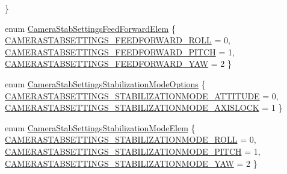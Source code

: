\begin{DoxyCompactItemize}
 \}
\item 
enum \hyperlink{group___camera_stab_settings_ga4bc67d38a639b8e80e953191e3742b9c}{\-Camera\-Stab\-Settings\-Feed\-Forward\-Elem} \{ \hyperlink{group___camera_stab_settings_gga4bc67d38a639b8e80e953191e3742b9ca3ed3cd5987ab68fa023c30aebaa58511}{\-C\-A\-M\-E\-R\-A\-S\-T\-A\-B\-S\-E\-T\-T\-I\-N\-G\-S\-\_\-\-F\-E\-E\-D\-F\-O\-R\-W\-A\-R\-D\-\_\-\-R\-O\-L\-L} = 0, 
\hyperlink{group___camera_stab_settings_gga4bc67d38a639b8e80e953191e3742b9ca5706d2470e4a9cd23a7189c431ca07aa}{\-C\-A\-M\-E\-R\-A\-S\-T\-A\-B\-S\-E\-T\-T\-I\-N\-G\-S\-\_\-\-F\-E\-E\-D\-F\-O\-R\-W\-A\-R\-D\-\_\-\-P\-I\-T\-C\-H} = 1, 
\hyperlink{group___camera_stab_settings_gga4bc67d38a639b8e80e953191e3742b9ca44cefcbe285047782fd884016dcf3cdc}{\-C\-A\-M\-E\-R\-A\-S\-T\-A\-B\-S\-E\-T\-T\-I\-N\-G\-S\-\_\-\-F\-E\-E\-D\-F\-O\-R\-W\-A\-R\-D\-\_\-\-Y\-A\-W} = 2
 \}
\item 
enum \hyperlink{group___camera_stab_settings_ga34fe3d7be18a3b4789da4fb07b5f3287}{\-Camera\-Stab\-Settings\-Stabilization\-Mode\-Options} \{ \hyperlink{group___camera_stab_settings_gga34fe3d7be18a3b4789da4fb07b5f3287ac9c35c367f0ce1790ecc2b5cf9878b5d}{\-C\-A\-M\-E\-R\-A\-S\-T\-A\-B\-S\-E\-T\-T\-I\-N\-G\-S\-\_\-\-S\-T\-A\-B\-I\-L\-I\-Z\-A\-T\-I\-O\-N\-M\-O\-D\-E\-\_\-\-A\-T\-T\-I\-T\-U\-D\-E} = 0, 
\hyperlink{group___camera_stab_settings_gga34fe3d7be18a3b4789da4fb07b5f3287a0b50897b1af1248f70511391200b3df3}{\-C\-A\-M\-E\-R\-A\-S\-T\-A\-B\-S\-E\-T\-T\-I\-N\-G\-S\-\_\-\-S\-T\-A\-B\-I\-L\-I\-Z\-A\-T\-I\-O\-N\-M\-O\-D\-E\-\_\-\-A\-X\-I\-S\-L\-O\-C\-K} = 1
 \}
\item 
enum \hyperlink{group___camera_stab_settings_gaf242304022aaac0ad2397872bb8114cc}{\-Camera\-Stab\-Settings\-Stabilization\-Mode\-Elem} \{ \hyperlink{group___camera_stab_settings_ggaf242304022aaac0ad2397872bb8114ccaa1189760c5c6fa81477e6b2dcb3ce509}{\-C\-A\-M\-E\-R\-A\-S\-T\-A\-B\-S\-E\-T\-T\-I\-N\-G\-S\-\_\-\-S\-T\-A\-B\-I\-L\-I\-Z\-A\-T\-I\-O\-N\-M\-O\-D\-E\-\_\-\-R\-O\-L\-L} = 0, 
\hyperlink{group___camera_stab_settings_ggaf242304022aaac0ad2397872bb8114ccabcd6b804ce7386f185920a013641502f}{\-C\-A\-M\-E\-R\-A\-S\-T\-A\-B\-S\-E\-T\-T\-I\-N\-G\-S\-\_\-\-S\-T\-A\-B\-I\-L\-I\-Z\-A\-T\-I\-O\-N\-M\-O\-D\-E\-\_\-\-P\-I\-T\-C\-H} = 1, 
\hyperlink{group___camera_stab_settings_ggaf242304022aaac0ad2397872bb8114ccac01f4690bc402e515ba70d45ee663df5}{\-C\-A\-M\-E\-R\-A\-S\-T\-A\-B\-S\-E\-T\-T\-I\-N\-G\-S\-\_\-\-S\-T\-A\-B\-I\-L\-I\-Z\-A\-T\-I\-O\-N\-M\-O\-D\-E\-\_\-\-Y\-A\-W} = 2
 \}
\end{DoxyCompactItemize}
